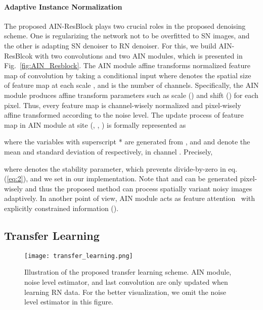 \documentclass[10pt,twocolumn,letterpaper]{article}
\begin{document}
\paragraph{Adaptive Instance Normalization}
The proposed AIN-ResBlock plays two crucial roles in the proposed denoising scheme.
One is regularizing the network not to be overfitted to SN images, and the other is adapting SN denoiser to RN denoiser.
For this, we build AIN-ResBlcok with two convolutions and two AIN modules, which is presented in Fig.~\ref{fig:AIN_Resblock}. 
The AIN module affine transforms normalized feature map  of convolution by taking a conditional input  where  denotes the spatial size of feature map at each scale , and  is the number of channels.
Specifically, the AIN module produces affine transform parameters such as scale () and shift () for each pixel.
Thus, every feature map is channel-wisely normalized and pixel-wisely affine transformed according to the noise level.
The update process of feature map in AIN module at site (, , ) is formally represented as

where the variables with superscript * are generated from , and  and  denote the mean and standard deviation of  respectively, in channel . Precisely,
  
where  denotes the stability parameter, which prevents divide-by-zero in eq. (\ref{eq:2}), and we set  in our implementation. Note that
 and  can be generated pixel-wisely and thus the proposed method can process spatially variant noisy images adaptively. 
In another point of view, AIN module acts as feature attention~\cite{chen2017sca,zhang2018image,woo2018cbam, dai2019second,kim2020agarnet} with explicitly constrained information ().


\subsection{Transfer Learning}
\begin{figure}[t]
	\centering				
	\texttt{[image: transfer\_learning.png]} 
	\caption{Illustration of the proposed transfer learning scheme. 
		AIN module, noise level estimator, and last convolution are only updated when learning RN data.
		For the better visualization, we omit the noise level estimator in this figure.}	
	\label{fig:transfer_learning}	
\end{figure}
\end{document}
